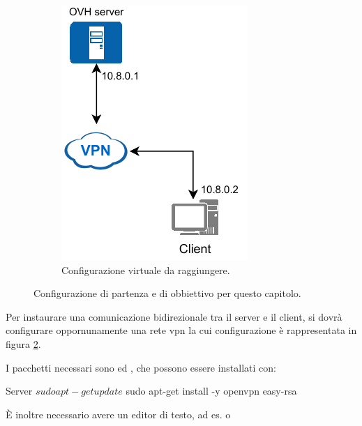 \begin{figure}[H]
\begin{subfigure}{0.5\textwidth}
        \includegraphics[height=1.2\linewidth]{immagini/diag-simple_ips_vpn}
        \caption{Configurazione virtuale da raggiungere.}
        \label{fig:diag-simple_ips_vpn}
    \end{subfigure}%
    \caption{Configurazione di partenza e di obbiettivo per questo capitolo. \cite{icons}}
\end{figure}

Per instaurare una comunicazione bidirezionale tra il server e il client, si dovrà configurare oppornunamente una rete vpn la cui configurazione è rappresentata in figura \ref{fig:diag-simple_ips_vpn}.

I pacchetti necessari sono  ed , che possono essere installati con:

\begin{bashcode}{Server}{}
$ sudo apt-get update
$ sudo apt-get install -y openvpn easy-rsa
\end{bashcode}

È inoltre necessario avere un editor di testo, ad es.  o 


